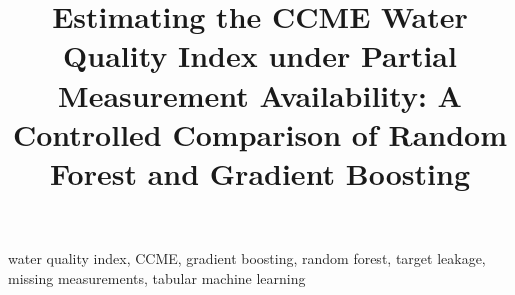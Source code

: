 \documentclass[conference]{IEEEtran}
\begin{document}
\title{Estimating the CCME Water Quality Index under Partial Measurement
Availability: A Controlled Comparison of Random Forest and Gradient Boosting}

\author{
\and
{}
\and
{}
\and
{}
\and
{}
}

\maketitle

\begin{abstract}

\end{abstract}

\begin{IEEEkeywords}
water quality index, CCME, gradient boosting, random forest, target leakage,
missing measurements, tabular machine learning
\end{IEEEkeywords}











\end{document}
